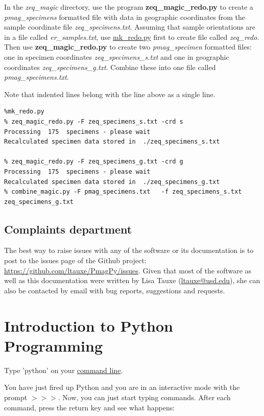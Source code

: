 \documentclass[11pt]{book}
\begin{document}
{{In the {\it zeq\_magic} directory, use the program {\bf zeq\_magic\_redo.py} to create a {\it pmag\_specimens} formatted file with data in geographic coordinates from the sample coordinate file {\it zeq\_specimens.txt}.  
Assuming that sample orientations are in a file called {\it er\_samples.txt}, use \href{#mk_redo.py}{mk\_redo.py} first to create file called {\it zeq\_redo}.  Then use 
{\bf zeq\_magic\_redo.py} to create two {\it pmag\_specimen} formatted files:  one in specimen coordinates {\it zeq\_specimens\_s.txt} and one in geographic coordinates {\it zeq\_specimens\_g.txt}.   Combine these into one file called {\it pmag\_specimens.txt}.  

Note that indented lines belong with the line above as a single line.  

\begin{verbatim}
%mk_redo.py
% zeq_magic_redo.py -F zeq_specimens_s.txt -crd s
Processing  175  specimens - please wait
Recalculated specimen data stored in  ./zeq_specimens_s.txt

% zeq_magic_redo.py -F zeq_specimens_g.txt -crd g
Processing  175  specimens - please wait
Recalculated specimen data stored in  ./zeq_specimens_g.txt
% combine_magic.py -F pmag_specimens.txt   -f zeq_specimens_s.txt zeq_specimens_g.txt
\end{verbatim}

%
\section{Complaints department}

The best way to raise issues with any of the software or its documentation is to post to the issues page of the Github project: \url{https://github.com/ltauxe/PmagPy/issues}. Given that most of the software as well as this documentation were written by Lisa Tauxe (\href{mailto:ltauxe@ucsd.edu}{ltauxe@usd.edu}), she can also be contacted by email with bug reports, suggestions and requests. 
\chapter{Introduction to Python Programming}
\label{chap:python}

Type 'python' on your \href{#command_line}{command line}.  

You have just fired up Python and  you are in an interactive mode with the prompt  {\color{blue}$>>>$}.  Now, you can just start typing commands. After each command, press the return key and see what happens:

}}
\end{document}
